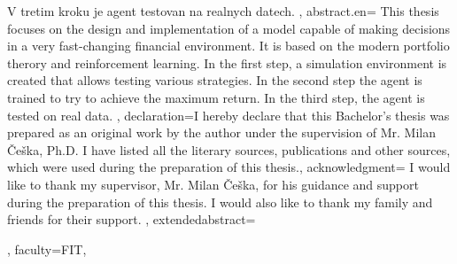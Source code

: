 {{        V tretim kroku je agent testovan na realnych datech.
    }, %
    abstract.en={
        This thesis focuses on the design and implementation of a model capable of
        making decisions in a very fast-changing financial environment. It is based on the
        modern portfolio therory and reinforcement learning.
        In the first step, a simulation environment is created
        that allows testing various strategies. In the second step
        the agent is trained to try to achieve the maximum return.
        In the third step, the agent is tested on real data.
    }, %
    declaration={I hereby declare that this Bachelor's thesis was prepared as an original work by the author under
    the supervision of Mr. Milan Češka, Ph.D. %
    I have listed all the literary sources, publications and other sources, which were used during the preparation of this thesis.},
%
    acknowledgment={
        I would like to thank my supervisor, Mr. Milan Češka, for his guidance and support during the preparation of this thesis.
        I would also like to thank my family and friends for their support.
    },
%
    extendedabstract={ %
        
    },
%
    faculty={FIT}, %
}
